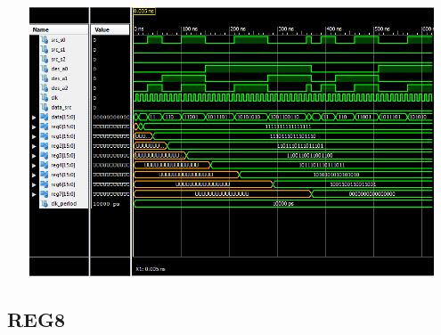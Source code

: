 \documentclass{article}
\begin{document}
\includegraphics[width=16cm, height=8cm]{test_reg_file_2.png}
\pagebreak

\subsection{REG8}\label{sec:result}
\end{document}

